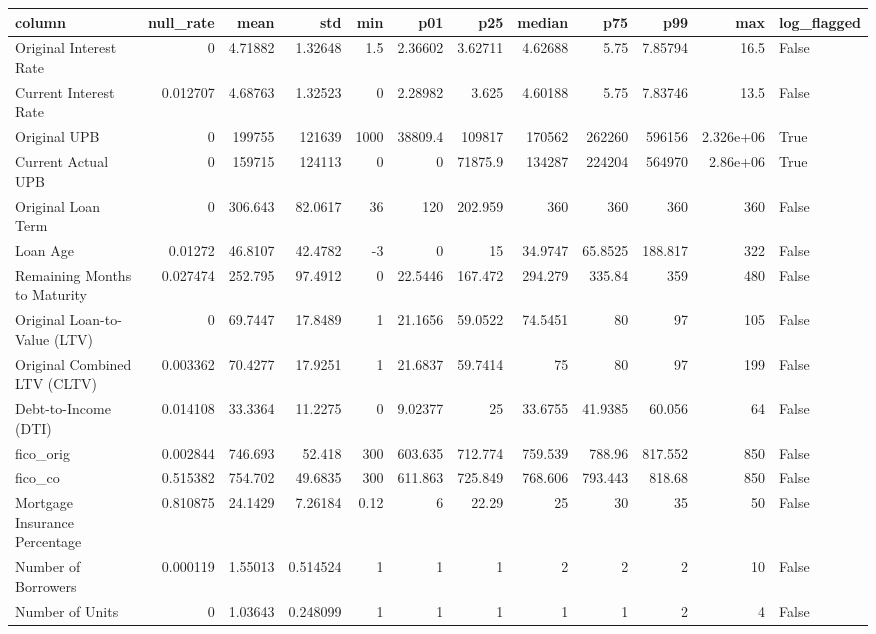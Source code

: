 \begin{tabular}{lrrrrrrrrrrl}
\toprule
column & null\_rate & mean & std & min & p01 & p25 & median & p75 & p99 & max & log\_flagged \\
\midrule
Original Interest Rate & 0 & 4.71882 & 1.32648 & 1.5 & 2.36602 & 3.62711 & 4.62688 & 5.75 & 7.85794 & 16.5 & False \\
Current Interest Rate & 0.012707 & 4.68763 & 1.32523 & 0 & 2.28982 & 3.625 & 4.60188 & 5.75 & 7.83746 & 13.5 & False \\
Original UPB & 0 & 199755 & 121639 & 1000 & 38809.4 & 109817 & 170562 & 262260 & 596156 & 2.326e+06 & True \\
Current Actual UPB & 0 & 159715 & 124113 & 0 & 0 & 71875.9 & 134287 & 224204 & 564970 & 2.86e+06 & True \\
Original Loan Term & 0 & 306.643 & 82.0617 & 36 & 120 & 202.959 & 360 & 360 & 360 & 360 & False \\
Loan Age & 0.01272 & 46.8107 & 42.4782 & -3 & 0 & 15 & 34.9747 & 65.8525 & 188.817 & 322 & False \\
Remaining Months to Maturity & 0.027474 & 252.795 & 97.4912 & 0 & 22.5446 & 167.472 & 294.279 & 335.84 & 359 & 480 & False \\
Original Loan-to-Value (LTV) & 0 & 69.7447 & 17.8489 & 1 & 21.1656 & 59.0522 & 74.5451 & 80 & 97 & 105 & False \\
Original Combined LTV (CLTV) & 0.003362 & 70.4277 & 17.9251 & 1 & 21.6837 & 59.7414 & 75 & 80 & 97 & 199 & False \\
Debt-to-Income (DTI) & 0.014108 & 33.3364 & 11.2275 & 0 & 9.02377 & 25 & 33.6755 & 41.9385 & 60.056 & 64 & False \\
fico\_orig & 0.002844 & 746.693 & 52.418 & 300 & 603.635 & 712.774 & 759.539 & 788.96 & 817.552 & 850 & False \\
fico\_co & 0.515382 & 754.702 & 49.6835 & 300 & 611.863 & 725.849 & 768.606 & 793.443 & 818.68 & 850 & False \\
Mortgage Insurance Percentage & 0.810875 & 24.1429 & 7.26184 & 0.12 & 6 & 22.29 & 25 & 30 & 35 & 50 & False \\
Number of Borrowers & 0.000119 & 1.55013 & 0.514524 & 1 & 1 & 1 & 2 & 2 & 2 & 10 & False \\
Number of Units & 0 & 1.03643 & 0.248099 & 1 & 1 & 1 & 1 & 1 & 2 & 4 & False \\
\bottomrule
\end{tabular}
